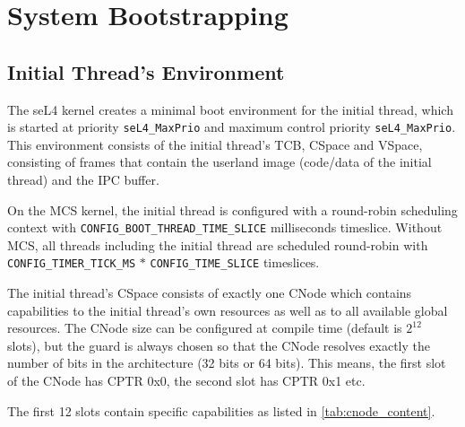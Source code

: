 %
%
%

\chapter{\label{ch:bootup}System Bootstrapping}

\section{Initial Thread's Environment}

The seL4 kernel creates a minimal boot environment for the initial thread, which
 is started at priority \texttt{seL4\_MaxPrio} and maximum control priority \texttt{seL4\_MaxPrio}.
This environment consists of the initial thread's TCB, CSpace and VSpace,
consisting of frames that contain the userland image (code/data of the initial
thread) and the IPC buffer.

On the MCS kernel, the initial thread is configured with a round-robin scheduling context
with \texttt{CONFIG\_BOOT\_THREAD\_TIME\_SLICE} milliseconds timeslice.
Without MCS, all threads including the initial thread are scheduled round-robin with
\texttt{CONFIG\_TIMER\_TICK\_MS} $*$ \texttt{CONFIG\_TIME\_SLICE} timeslices.

The initial thread's CSpace consists of exactly one CNode
which contains capabilities to the initial
thread's own resources as well as to all available global resources.
The CNode size can be configured at compile time (default is $2^{12}$
slots), but the guard is always chosen so that the CNode resolves exactly
the number of bits in the architecture (32 bits or 64 bits). This means, the
first slot of the CNode has CPTR 0x0, the second slot has CPTR 0x1 etc.

The first 12 slots contain specific capabilities as listed in
\autoref{tab:cnode_content}.

